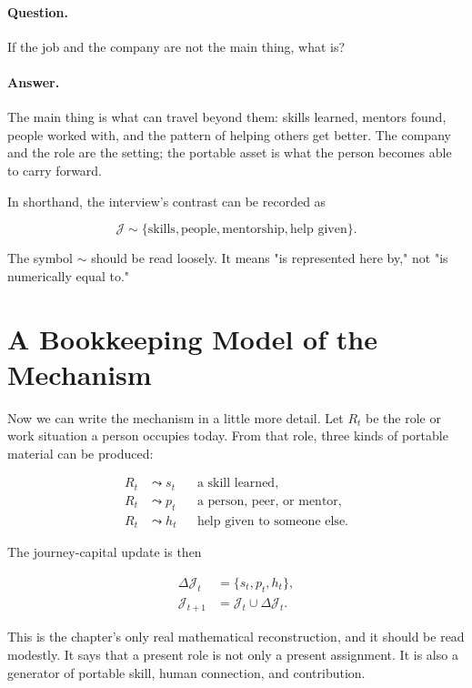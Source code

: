 \paragraph{Question.}
If the job and the company are not the main thing, what is?

\paragraph{Answer.}
The main thing is what can travel beyond them: skills learned, mentors found, people worked with, and the pattern of helping others get better. The company and the role are the setting; the portable asset is what the person becomes able to carry forward.

In shorthand, the interview's contrast can be recorded as

\begin{equation}
\mathcal{J}
\sim
\{\text{skills},\text{people},\text{mentorship},\text{help given}\}.
\end{equation}

The symbol \(\sim\) should be read loosely. It means "is represented here by," not "is numerically equal to."

\section{A Bookkeeping Model of the Mechanism}

Now we can write the mechanism in a little more detail. Let \(R_t\) be the role or work situation a person occupies today. From that role, three kinds of portable material can be produced:

\begin{align}
R_t &\leadsto s_t && \text{a skill learned},\\
R_t &\leadsto p_t && \text{a person, peer, or mentor},\\
R_t &\leadsto h_t && \text{help given to someone else}.
\end{align}

The journey-capital update is then

\begin{align}
\Delta \mathcal{J}_t &= \{s_t,p_t,h_t\},\\
\mathcal{J}_{t+1} &= \mathcal{J}_t \cup \Delta \mathcal{J}_t.
\end{align}

This is the chapter's only real mathematical reconstruction, and it should be read modestly. It says that a present role is not only a present assignment. It is also a generator of portable skill, human connection, and contribution.


